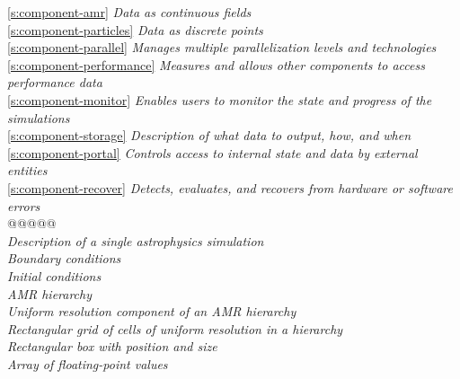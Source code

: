 \begin{tabbing}
\ref{s:component-amr}  \>\>\>              \>\> \textit{Data as continuous fields} \\
\ref{s:component-particles}  \>\>\>              \>\> \textit{Data as discrete points} \\
\ref{s:component-parallel}  \>\>          \>\>\> \textit{Manages multiple parallelization levels and technologies} \\
\ref{s:component-performance}  \>\>       \>\>\> \textit{Measures and allows other components to access performance data} \\
\ref{s:component-monitor}  \>\>           \>\>\> \textit{Enables users to monitor the state and progress of the simulations} \\
\ref{s:component-storage}  \>\>            \>\>\> \textit{Description of what data to output, how, and when} \\
\ref{s:component-portal}  \>\>            \>\>\> \textit{Controls access to internal state and data by external entities} \\
\ref{s:component-recover}  \>\>          \>\>\> \textit{Detects, evaluates, and recovers from hardware or software errors} \\
@@@@@ \\

  \>        \>\>\>\> \textit{Description of a single astrophysics simulation} \\
  \>\>\>          \>\> \textit{Boundary conditions} \\
  \>\>\>           \>\> \textit{Initial conditions} \\
  \>\>\>         \>\> \textit{AMR hierarchy} \\
  \>\>\>             \>\> \textit{Uniform resolution component of an AMR hierarchy} \\
  \>\>\>             \>\> \textit{Rectangular grid of cells of uniform resolution in a hierarchy} \\
  \>\>\>\>               \> \textit{Rectangular box with position and size} \\
  \>\>\>\>             \> \textit{Array of floating-point values} \\
\end{tabbing}


